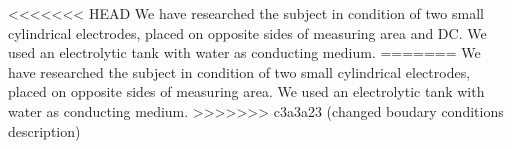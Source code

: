 \documentclass{article}
\begin{document}
<<<<<<< HEAD
We have researched the subject in condition of two small cylindrical electrodes, placed on opposite sides of measuring area and DC. We used an electrolytic tank with water as conducting medium.
=======
We have researched the subject in condition of two small cylindrical electrodes, placed on opposite sides of measuring area. We used an electrolytic tank with water as conducting medium.
>>>>>>> c3a3a23 (changed boudary conditions description)





\end{document}
